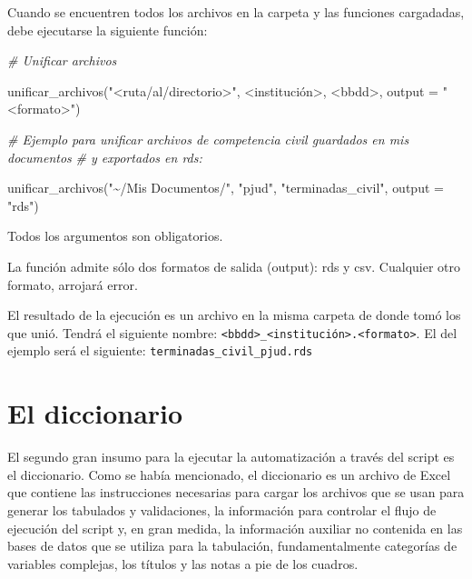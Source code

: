 \documentclass[
  spanish,
]{book}
\newenvironment{Shaded}{\begin{snugshade}}{\end{snugshade}}
\newcommand{\AttributeTok}[1]{\textcolor[rgb]{0.77,0.63,0.00}{#1}}
\newcommand{\CommentTok}[1]{\textcolor[rgb]{0.56,0.35,0.01}{\textit{#1}}}
\newcommand{\FunctionTok}[1]{\textcolor[rgb]{0.00,0.00,0.00}{#1}}
\newcommand{\NormalTok}[1]{#1}
\newcommand{\SpecialCharTok}[1]{\textcolor[rgb]{0.00,0.00,0.00}{#1}}
\newcommand{\StringTok}[1]{\textcolor[rgb]{0.31,0.60,0.02}{#1}}
\begin{document}
Cuando se encuentren todos los archivos en la carpeta y las funciones cargadadas, debe ejecutarse la siguiente función:

\begin{Shaded}
\begin{Highlighting}[]
\CommentTok{\# Unificar archivos}

\FunctionTok{unificar\_archivos}\NormalTok{(}\StringTok{"\textless{}ruta/al/directorio\textgreater{}"}\NormalTok{, }\SpecialCharTok{\textless{}}\NormalTok{institución}\SpecialCharTok{\textgreater{}}\NormalTok{, }\SpecialCharTok{\textless{}}\NormalTok{bbdd}\SpecialCharTok{\textgreater{}}\NormalTok{, }\AttributeTok{output =} \StringTok{"\textless{}formato\textgreater{}"}\NormalTok{)}

\CommentTok{\# Ejemplo para unificar archivos de competencia civil guardados en mis documentos}
\CommentTok{\# y exportados en rds:}

\FunctionTok{unificar\_archivos}\NormalTok{(}\StringTok{"\textasciitilde{}/Mis Documentos/"}\NormalTok{, }\StringTok{"pjud"}\NormalTok{, }\StringTok{"terminadas\_civil"}\NormalTok{, }\AttributeTok{output =} \StringTok{"rds"}\NormalTok{)}
\end{Highlighting}
\end{Shaded}

Todos los argumentos son obligatorios.

La función admite sólo dos formatos de salida (output): rds y csv. Cualquier otro formato, arrojará error.

El resultado de la ejecución es un archivo en la misma carpeta de donde tomó los que unió. Tendrá el siguiente nombre: \texttt{\textless{}bbdd\textgreater{}\_\textless{}institución\textgreater{}.\textless{}formato\textgreater{}}. El del ejemplo será el siguiente: \texttt{terminadas\_civil\_pjud.rds}

\hypertarget{el-diccionario}{%
\chapter{El diccionario}\label{el-diccionario}}

El segundo gran insumo para la ejecutar la automatización a través del script es el diccionario. Como se había mencionado, el diccionario es un archivo de Excel que contiene las instrucciones necesarias para cargar los archivos que se usan para generar los tabulados y validaciones, la información para controlar el flujo de ejecución del script y, en gran medida, la información auxiliar no contenida en las bases de datos que se utiliza para la tabulación, fundamentalmente categorías de variables complejas, los títulos y las notas a pie de los cuadros.
\end{document}
